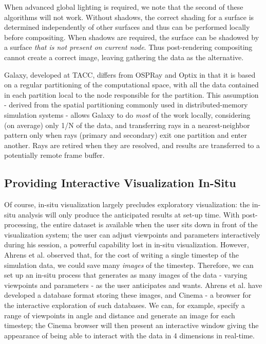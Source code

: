 \documentclass[journal]{IEEEtran}
\begin{document}
When advanced global lighting is required, we note that the second of these algorithms will not work.  Without shadows, the correct shading for a surface is determined independently of other surfaces and thus can be performed locally before compositing.  When shadows are required, the surface can be shadowed by a surface \textit{that is not present on current node}.  Thus post-rendering compositing cannot create a correct image, leaving gathering the data as the alternative.

Galaxy, developed at TACC, differs from OSPRay and Optix in that it is based on a regular partitioning of the computational space, with all the data contained in each partition local to the node responsible for the partition. This assumption - derived from the spatial partitioning commonly used in distributed-memory simulation systems - allows Galaxy to do \textit{most} of the work locally, considering (on average) only 1/N of the data, and transferring rays in a nearest-neighbor pattern only when rays (primary and secondary) exit one partition and enter another.  Rays are retired when they are resolved, and results are transferred to a potentially remote frame buffer.
 
\subsection{Providing Interactive Visualization In-Situ}
Of course, in-situ visualization largely precludes exploratory visualization: the in-situ analysis will only produce the anticipated results at set-up time.  With post-processing, the entire dataset is available when the user sits down in front of the visualization system; the user can adjust viewpoints and parameters interactively during his session, a powerful capability lost in in-situ visualization. However, Ahrens et al. \cite{Ahrens2014cinema} observed that, for the cost of writing a single timestep of the simulation data, we could save many \textit{images} of the timestep.  Therefore, we can set up an in-situ process that generates as many images of the data - varying viewpoints and parameters - as the user anticipates and wants. Ahrens et al. have developed a database format storing these images, and Cinema - a browser for the interactive exploration of such databases.  We can, for example, specify a range of viewpoints in angle and distance and generate an image for each timestep; the Cinema browser will then present an interactive window giving the appearance of being able to interact with the data in 4 dimensions in real-time.
\end{document}
